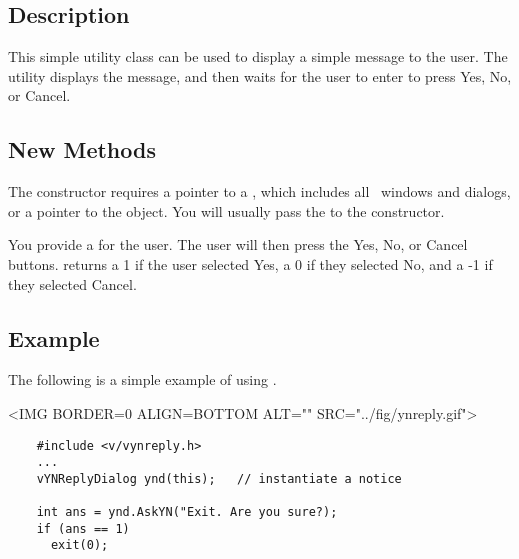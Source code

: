 \subsection* {Description}

This simple utility class can be used to display a simple
message to the user. The utility displays the message, and then
waits for the user to enter to press Yes, No, or Cancel.

\subsection* {New Methods}


The  constructor requires a pointer to a
, which includes all \V\ windows and dialogs,
or a pointer to the  object.
You will usually pass the  to the constructor.


You provide a  for the user. The user will then press
the Yes, No, or Cancel buttons.  returns a 1 if
the user selected Yes, a 0 if they selected No, and a -1 if
they selected Cancel.

\subsection*{Example}

The following is a simple example of using .

\vspace{.1in}

\small
\begin{rawhtml}
<IMG BORDER=0 ALIGN=BOTTOM ALT="" SRC="../fig/ynreply.gif">
\end{rawhtml}
\begin{latexonly}

\end{latexonly}
\normalfont\normalsize

\footnotesize
\begin{verbatim}
    #include <v/vynreply.h>
    ...
    vYNReplyDialog ynd(this);   // instantiate a notice

    int ans = ynd.AskYN("Exit. Are you sure?);
    if (ans == 1)
      exit(0);
\end{verbatim}
\normalfont\normalsize

